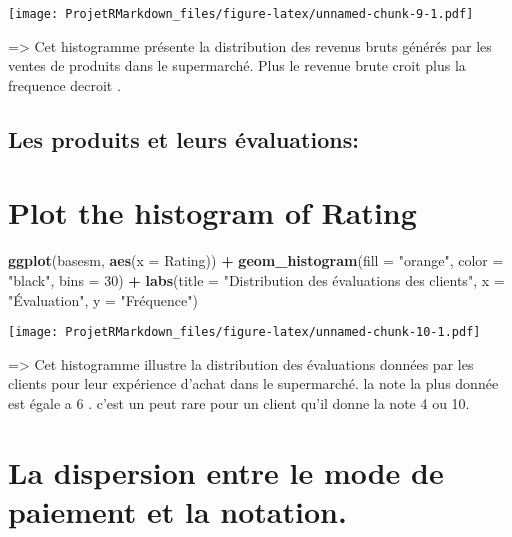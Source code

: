 \documentclass[
]{article}
\newenvironment{Shaded}{\begin{snugshade}}{\end{snugshade}}
\newcommand{\AttributeTok}[1]{\textcolor[rgb]{0.13,0.29,0.53}{#1}}
\newcommand{\DecValTok}[1]{\textcolor[rgb]{0.00,0.00,0.81}{#1}}
\newcommand{\FunctionTok}[1]{\textcolor[rgb]{0.13,0.29,0.53}{\textbf{#1}}}
\newcommand{\NormalTok}[1]{#1}
\newcommand{\SpecialCharTok}[1]{\textcolor[rgb]{0.81,0.36,0.00}{\textbf{#1}}}
\newcommand{\StringTok}[1]{\textcolor[rgb]{0.31,0.60,0.02}{#1}}
\begin{document}
\texttt{[image: ProjetRMarkdown\_files/figure-latex/unnamed-chunk-9-1.pdf]}

=\textgreater{} Cet histogramme présente la distribution des revenus
bruts générés par les ventes de produits dans le supermarché. Plus le
revenue brute croit plus la frequence decroit .

\hypertarget{les-produits-et-leurs-uxe9valuations}{%
\subsection{Les produits et leurs
évaluations:}\label{les-produits-et-leurs-uxe9valuations}}

\hypertarget{plot-the-histogram-of-rating}{%
\section{Plot the histogram of
Rating}\label{plot-the-histogram-of-rating}}

\begin{Shaded}
\begin{Highlighting}[]
\FunctionTok{ggplot}\NormalTok{(basesm, }\FunctionTok{aes}\NormalTok{(}\AttributeTok{x =}\NormalTok{ Rating)) }\SpecialCharTok{+}
  \FunctionTok{geom\_histogram}\NormalTok{(}\AttributeTok{fill =} \StringTok{"orange"}\NormalTok{, }\AttributeTok{color =} \StringTok{"black"}\NormalTok{, }\AttributeTok{bins =} \DecValTok{30}\NormalTok{) }\SpecialCharTok{+}
  \FunctionTok{labs}\NormalTok{(}\AttributeTok{title =} \StringTok{"Distribution des évaluations des clients"}\NormalTok{,}
       \AttributeTok{x =} \StringTok{"Évaluation"}\NormalTok{,}
       \AttributeTok{y =} \StringTok{"Fréquence"}\NormalTok{)}
\end{Highlighting}
\end{Shaded}

\texttt{[image: ProjetRMarkdown\_files/figure-latex/unnamed-chunk-10-1.pdf]}

=\textgreater{} Cet histogramme illustre la distribution des évaluations
données par les clients pour leur expérience d'achat dans le
supermarché. la note la plus donnée est égale a 6 . c'est un peut rare
pour un client qu'il donne la note 4 ou 10.

\hypertarget{la-dispersion-entre-le-mode-de-paiement-et-la-notation.}{%
\section{La dispersion entre le mode de paiement et la
notation.}\label{la-dispersion-entre-le-mode-de-paiement-et-la-notation.}}
\end{document}
